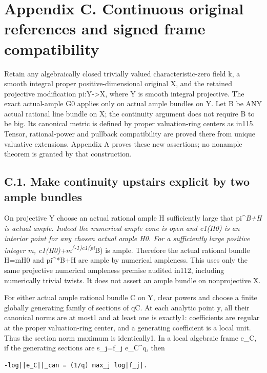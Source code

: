 \documentclass[
  10pt,
]{article}
\begin{document}
\section{Appendix C. Continuous original references and signed frame
compatibility}\label{appendix-c.-continuous-original-references-and-signed-frame-compatibility}

Retain any algebraically closed trivially valued characteristic-zero
field k, a smooth integral proper positive-dimensional original X, and
the retained projective modification pi:Y-\textgreater X, where Y is
smooth integral projective. The exact actual-ample G0 applies only on
actual ample bundles on Y. Let B be ANY actual rational line bundle on
X; the continuity argument does not require B to be big. Its canonical
metric is defined by proper valuation-ring centers as in115. Tensor,
rational-power and pullback compatibility are proved there from unique
valuative extensions. Appendix A proves these new assertions; no
nonample theorem is granted by that construction.

\subsection{C.1. Make continuity upstairs explicit by two ample
bundles}\label{c.1.-make-continuity-upstairs-explicit-by-two-ample-bundles}

On projective Y choose an actual rational ample H sufficiently large
that pi\^{}\emph{B+H is actual ample. Indeed the numerical ample cone is
open and c1(H0) is an interior point for any chosen actual ample H0. For
a sufficiently large positive integer m,
c1(H0)+m\textsuperscript{(-1)c1(pi}}B) is ample. Therefore the actual
rational bundle H=mH0 and pi\^{}*B+H are ample by numerical ampleness.
This uses only the same projective numerical ampleness premise audited
in112, including numerically trivial twists. It does not assert an ample
bundle on nonprojective X.

For either actual ample rational bundle C on Y, clear powers and choose
a finite globally generating family of sections of qC. At each analytic
point y, all their canonical norms are at most1 and at least one is
exactly1: coefficients are regular at the proper valuation-ring center,
and a generating coefficient is a local unit. Thus the section norm
maximum is identically1. In a local algebraic frame e\_C, if the
generating sections are s\_j=f\_j e\_C\^{}q, then

\begin{verbatim}
-log||e_C||_can = (1/q) max_j log|f_j|.
\end{verbatim}
\end{document}
